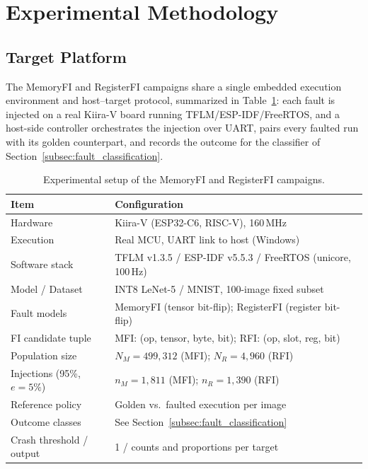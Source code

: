 \documentclass[conference]{IEEEtran}
\begin{document}
\section{Experimental Methodology}
\label{sec:methodology}

\subsection{Target Platform}
\label{subsec:target_platform}

The MemoryFI and RegisterFI campaigns share a single embedded execution environment and host--target protocol, summarized in Table~\ref{tab:experimental_setup}: each fault is injected on a real Kiira-V board running TFLM/ESP-IDF/FreeRTOS, and a host-side controller orchestrates the injection over UART, pairs every faulted run with its golden counterpart, and records the outcome for the classifier of Section~\ref{subsec:fault_classification}.

\begin{table}[t]
\centering
\caption{Experimental setup of the MemoryFI and RegisterFI campaigns.}
\label{tab:experimental_setup}
\scriptsize
\renewcommand{\arraystretch}{0.88}
\begin{tabular}{p{}p{}}
\hline
\textbf{Item} & \textbf{Configuration} \\
\hline
Hardware & Kiira-V (ESP32-C6, RISC-V), 160\,MHz \\
Execution & Real MCU, UART link to host (Windows) \\
Software stack & TFLM v1.3.5 / ESP-IDF v5.5.3 / FreeRTOS (unicore, 100\,Hz) \\
Model / Dataset & INT8 LeNet-5 / MNIST, 100-image fixed subset \\
Fault models & MemoryFI (tensor bit-flip); RegisterFI (register bit-flip) \\
FI candidate tuple & MFI: (op, tensor, byte, bit); RFI: (op, slot, reg, bit) \\
Population size & $N_M{=}499{,}312$ (MFI); $N_R{=}4{,}960$ (RFI) \\
Injections (95\%, $e{=}5\%$) & $n_M{=}1{,}811$ (MFI); $n_R{=}1{,}390$ (RFI) \\
Reference policy & Golden vs.\ faulted execution per image \\
Outcome classes & See Section~\ref{subsec:fault_classification} \\
Crash threshold / output & 1 / counts and proportions per target \\
\hline
\end{tabular}
\end{table}
\end{document}
